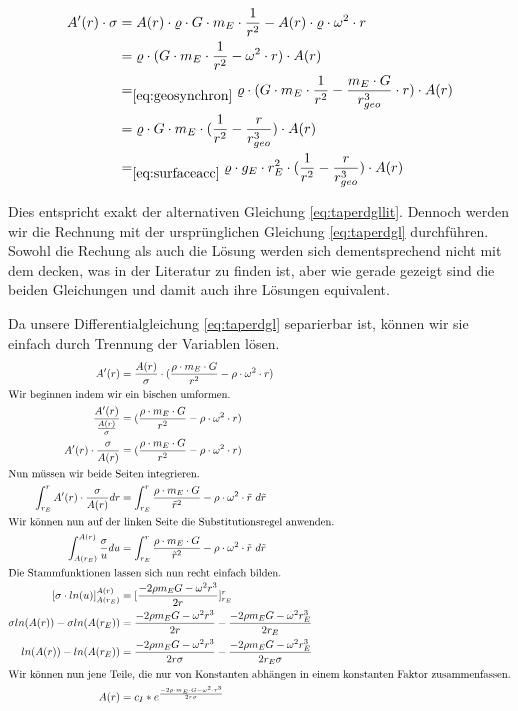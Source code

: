 \documentclass[a4paper, 10pt]{report}
\begin{document}
\begin{align*}
A'(r) \cdot \sigma &= A(r) \cdot \varrho \cdot G \cdot m_E \cdot \frac{1}{r^2} - A(r) \cdot \varrho \cdot \omega^2 \cdot r\\
&= \varrho \cdot (G \cdot m_E \cdot \frac{1}{r^2} - \omega^2 \cdot r) \cdot A(r)\\
&=_{\ref{eq:geosynchron}} \varrho \cdot (G \cdot m_E \cdot \frac{1}{r^2} - \frac{m_E \cdot G}{r_{geo}^3} \cdot r) \cdot A(r)\\
&= \varrho \cdot G \cdot m_E \cdot (\frac{1}{r^2} - \frac{r}{r_{geo}^3}) \cdot A(r)\\
&=_{\ref{eq:surfaceacc}} \varrho \cdot g_E \cdot r_E^2 \cdot (\frac{1}{r^2} - \frac{r}{r_{geo}^3}) \cdot A(r)\\
\end{align*}

Dies entspricht exakt der alternativen Gleichung \ref{eq:taperdgllit}. Dennoch werden wir die Rechnung mit der ursprünglichen Gleichung \ref{eq:taperdgl} durchführen. Sowohl die Rechung als auch die Lösung werden sich dementsprechend nicht mit dem decken, was in der Literatur zu finden ist, aber wie gerade gezeigt sind die beiden Gleichungen und damit auch ihre Lösungen equivalent.

Da unsere Differentialgleichung \ref{eq:taperdgl} separierbar ist, können wir sie einfach durch Trennung der Variablen lösen.
\begin{align*}
A'(r) &= \frac{A(r)}{\sigma} \cdot (\frac{\rho\cdot m_E \cdot G}{r^2} - \rho \cdot \omega^2 \cdot r)\\
\intertext{Wir beginnen indem wir ein bischen umformen.}
\frac{A'(r)}{\frac{A(r)}{\sigma}} &= (\frac{\rho\cdot m_E \cdot G}{r^2} - \rho \cdot \omega^2 \cdot r)\\
A'(r) \cdot \frac{\sigma}{A(r)} &= (\frac{\rho\cdot m_E \cdot G}{r^2} - \rho \cdot \omega^2 \cdot r)\\
\intertext{Nun müssen wir beide Seiten integrieren.}
\int_{r_E}^{r} A'(r) \cdot \frac{\sigma}{A(r)} dr &=  \int_{r_E}^{r} \frac{\rho\cdot m_E \cdot G}{\tilde{r}^2} - \rho \cdot \omega^2 \cdot \tilde{r} \ d\tilde{r}\\
\intertext{Wir können nun auf der linken Seite die Substitutionsregel anwenden.}
\int_{A(r_E)}^{A(r)} \frac{\sigma}{u} du &=  \int_{r_E}^{r} \frac{\rho\cdot m_E \cdot G}{\tilde{r}^2} - \rho \cdot \omega^2 \cdot \tilde{r} \ d\tilde{r}\\
\intertext{Die Stammfunktionen lassen sich nun recht einfach bilden.}
[\sigma \cdot ln(u)]_{A(r_E)}^{A(r)} &=  [\frac{-2\rho m_E G - \omega^2 r^3}{2 r}]_{r_E}^{r}\\
\sigma ln(A(r)) - \sigma ln(A(r_E)) &= \frac{-2\rho m_E G - \omega^2 r^3}{2 r} - \frac{-2\rho m_E G - \omega^2 r_E^3}{2 r_E}\\
ln(A(r)) - ln(A(r_E)) &= \frac{-2\rho m_E G - \omega^2 r^3}{2 r \sigma} - \frac{-2\rho m_E G - \omega^2 r_E^3}{2 r_E \sigma}\\
\intertext{Wir können nun jene Teile, die nur von Konstanten abhängen in einem konstanten Faktor zusammenfassen.}
A(r) &= c_I * e^{\frac{-2\rho \cdot m_E \cdot G - \omega^2 \cdot r^3}{2 r \sigma}}
\end{align*}
\end{document}
